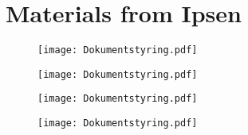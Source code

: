 \chapter{Materials from Ipsen} \label{bilag:PiasPPT}
\begin{figure}[H]
	\centering
	\texttt{[image: Dokumentstyring.pdf]}
\end{figure}
\begin{figure}[H]
	\centering
	\texttt{[image: Dokumentstyring.pdf]}
\end{figure}
\newpage
\begin{figure}[H]
	\centering
	\texttt{[image: Dokumentstyring.pdf]}
\end{figure}
\begin{figure}[H]
	\centering
	\texttt{[image: Dokumentstyring.pdf]}
\end{figure}


%
